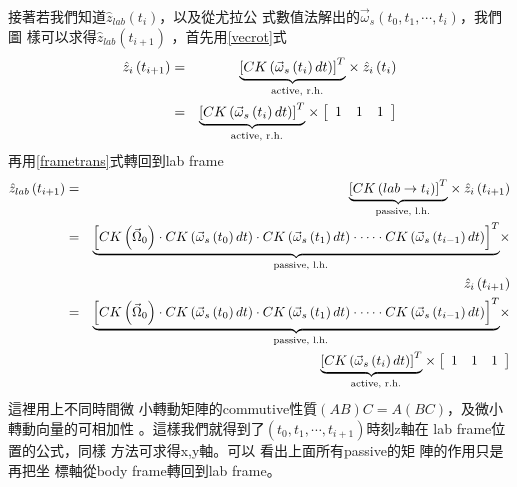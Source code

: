\documentclass[12pt,a4paper]{article}
\begin{document}
接著若我們知道$\hat{z}_{lab}\left(
t_{i}\right) $，以及從尤拉公%
式數值法解出的$\vec{\omega}%
_{s}\left( t_{0},t_{1},\cdots ,t_{i}\right) $，我們圖%
樣可以求得$\hat{z}_{lab}\left( t_{i+1}\right) $%
，首先用\ref{vecrot}式%
\begin{eqnarray*}
\hat{z}_{i}\left( t_{i+1}\right) &=&\underset{\text{active, r.h.}}{%
\underbrace{\left[ CK\left( \vec{\omega}_{s}\left( t_{i}\right) dt\right) %
\right] ^{T}}}\times \hat{z}_{i}\left( t_{i}\right) \\
&=&\underset{\text{active, r.h.}}{\underbrace{\left[ CK\left( \vec{\omega}%
_{s}\left( t_{i}\right) dt\right) \right] ^{T}}}\times \left[ 
\begin{array}{ccc}
1 & 1 & 1%
\end{array}%
\right]
\end{eqnarray*}%
再用\ref{frametrans}式轉回到lab frame%
\begin{eqnarray*}
\hat{z}_{lab}\left( t_{i+1}\right) &=&\underset{\text{passive, l.h.}}{%
\underbrace{\left[ CK\left( lab\rightarrow t_{i}\right) \right] ^{T}}}\times 
\hat{z}_{i}\left( t_{i+1}\right) \\
&=&\underset{\text{passive, l.h.}}{\underbrace{\left[ CK\left( \vec{\Omega}%
_{0}\right) \cdot CK\left( \vec{\omega}_{s}\left( t_{0}\right) dt\right)
\cdot CK\left( \vec{\omega}_{s}\left( t_{1}\right) dt\right) \cdot \cdots
\cdot CK\left( \vec{\omega}_{s}\left( t_{i-1}\right) dt\right) \right] ^{T}}}%
\times \\
&&\hat{z}_{i}\left( t_{i+1}\right) \\
&=&\underset{\text{passive, l.h.}}{\underbrace{\left[ CK\left( \vec{\Omega}%
_{0}\right) \cdot CK\left( \vec{\omega}_{s}\left( t_{0}\right) dt\right)
\cdot CK\left( \vec{\omega}_{s}\left( t_{1}\right) dt\right) \cdot \cdots
\cdot CK\left( \vec{\omega}_{s}\left( t_{i-1}\right) dt\right) \right] ^{T}}}%
\times \\
&&\underset{\text{active, r.h.}}{\underbrace{\left[ CK\left( \vec{\omega}%
_{s}\left( t_{i}\right) dt\right) \right] ^{T}}}\times \left[ 
\begin{array}{ccc}
1 & 1 & 1%
\end{array}%
\right]
\end{eqnarray*}%
這裡用上不同時間微%
小轉動矩陣的commutive性質$%
\left( AB\right) C=A\left( BC\right) $，及微小%
轉動向量的可相加性%
。這樣我們就得到了$%
\left( t_{0},t_{1},\cdots ,t_{i+1}\right) $時刻z軸在%
lab frame位置的公式，同樣%
方法可求得x,y軸。可以%
看出上面所有passive的矩%
陣的作用只是再把坐%
標軸從body frame轉回到lab frame。
\end{document}
